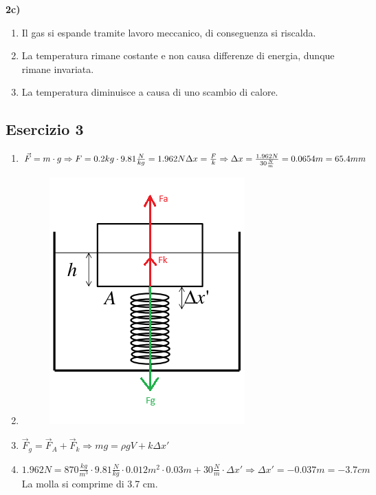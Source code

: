 \documentclass{article}
\begin{document}
\textbf{2c)} \\

\begin{enumerate}[label=\textbf{.\roman*)}]
    \item Il gas si espande tramite lavoro meccanico, di conseguenza si riscalda.
    \item La temperatura rimane costante e non causa differenze di energia,
        dunque rimane invariata.
    \item La temperatura diminuisce a causa di uno scambio di calore.
\end{enumerate}
\pagebreak

\subsection*{Esercizio 3}

\begin{enumerate}[label=\textbf{3\alph*)}]
    \item $\vec{F}=m\cdot g \Rightarrow F=0.2kg \cdot 9.81 \frac{N}{kg}=1.962N \\ \\
        \Delta x=\frac{F}{k} \Rightarrow \Delta x=\frac{1.962N}{30\frac{N}{m}}
        = 0.0654m = 65.4mm$
    \item \phantom{}
        \begin{figure}[h!]
            \hspace*{.75cm} \includegraphics*[width=.25\textwidth]{Esercizio 3 - Forze.png}
        \end{figure}
    \item $\vec{F}_g = \vec{F}_A + \vec{F}_k \Rightarrow m g = \rho g V + k \Delta x' $
    \item $1.962N = 870 \frac{kg}{m^3} \cdot 9.81 \frac{N}{kg} \cdot 0.012 m^2 \cdot 0.03m + 
    30 \frac{N}{m} \cdot \Delta x' \Rightarrow \Delta x' = -0.037m = -3.7cm$\\
    La molla si comprime di 3.7 cm.
\end{enumerate}
\pagebreak
\end{document}
